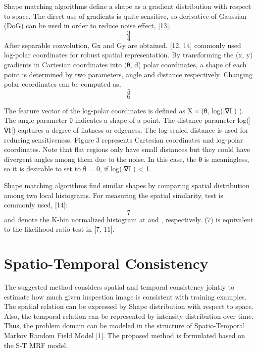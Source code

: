 \documentclass[a4paper,twocolumn, 10pt]{article}
\begin{document}
Shape matching algorithms define a shape as a gradient distribution with respect to space. The direct use of gradients is quite sensitive, so derivative of Gaussian (DoG) can be used in order to reduce noise effect, [13].
\begin{equation}
  3
\end{equation}
\begin{equation}
  4
\end{equation}
After separable convolution, Gx and Gy are obtained. [12, 14] commonly used log-polar coordinates for robust spatial representation. By transforming the (x, y) gradients in Cartesian coordinates into (θ, d) polar coordinates, a shape of each point is determined by two parameters, angle and distance respectively. Changing polar coordinates can be computed as,
\begin{equation}
  5
\end{equation}
\begin{equation}
  6
\end{equation}

The feature vector of the log-polar coordinates is defined as X ≡ (θ, log(|∇I|) ). The angle parameter θ indicates a shape of a point. The distance parameter log(|∇I|) captures a degree of flatness or edgeness. The log-scaled distance is used for reducing sensitiveness. Figure 3 represents Cartesian coordinates and log-polar coordinates. Note that flat regions only have small distances but they could have divergent angles among them due to the noise. In this case, the θ is meaningless, so it is desirable to set to θ = 0, if log(|∇I|) < 1. 


Shape matching algorithms find similar shapes by comparing spatial distribution among two local histograms. For measuring the spatial similarity,   test is commonly used, [14]:
\begin{equation}
  7
\end{equation}
  and   denote the K-bin normalized histogram at   and  , respectively. (7) is equivalent to the likelihood ratio test in [7, 11].



\section{Spatio-Temporal Consistency}
The suggested method considers spatial and temporal consistency jointly to estimate how much given inspection image is consistent with training examples. The spatial relation can be expressed by Shape distribution with respect to space. Also, the temporal relation can be represented by intensity distribution over time. Thus, the problem domain can be modeled in the structure of Spatio-Temporal Markov Random Field Model [1]. The proposed method is formulated based on the S-T MRF model.
\end{document}
